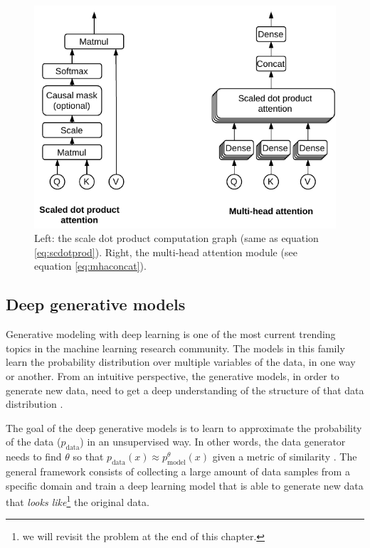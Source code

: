 \begin{figure}
	\centering
	\includegraphics[width=0.85\linewidth]{chapter2/images/attention_modules}
	\caption{Left: the scale dot product computation graph (same as equation \ref{eq:scdotprod}). Right, the multi-head attention module (see equation \ref{eq:mhaconcat}).}
	\label{fig:attentionmodules}
\end{figure}

\subsection{Deep generative models} \label{sec:generative}
Generative modeling with deep learning is one of the most current trending topics in the machine learning research community. The models in this family learn the probability distribution over multiple variables of the data, in one way or another. From an intuitive perspective, the generative models, in order to generate new data, need to get a deep understanding of the structure of that data distribution \autocite{Goodfellow2016}.

The goal of the deep generative models is to learn to approximate the probability of the data ($p_\mathrm{data}$) in an unsupervised way. In other words, the data generator needs to find $\theta$ so that $p_\mathrm{data}(x) \approx p_\mathrm{model}^\theta(x)$ given a metric of similarity \autocite{Goodfellow2016}. The general framework consists of collecting a large amount of data samples from a specific domain and train a deep learning model that is able to generate new data that \textit{looks like}\footnote{we will revisit the problem at the end of this chapter.} the original data.

